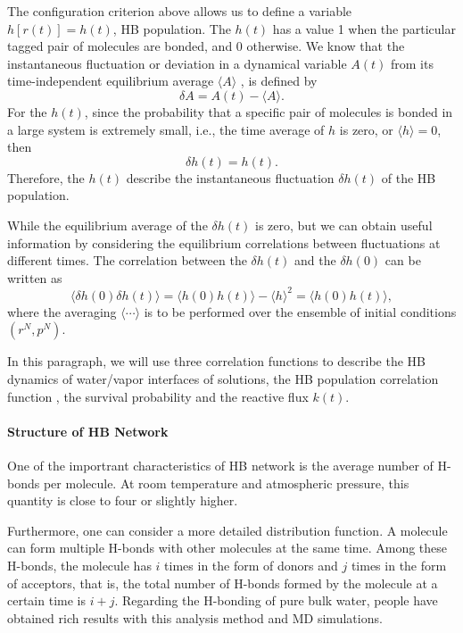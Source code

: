 The configuration criterion above allows us to define a variable $h[r(t)] = h(t)$, HB population. 
The $h(t)$ has a value 1 when the particular tagged pair of molecules are bonded, and 0 otherwise. 
We know that the instantaneous fluctuation or deviation in a dynamical variable $A(t)$ from its time-independent equilibrium average $\langle A\rangle$ , 
is defined by \cite{DC87} 
$$
\delta A = A(t) - \langle A\rangle.
$$
For the $h(t)$, since the probability that a specific pair of molecules is bonded in a large system is extremely small, i.e., 
the time average of $h$ is zero, or  
$\langle h \rangle = 0$,
then
$$
\delta h(t) = h(t).
$$
Therefore, the $h(t)$ describe the instantaneous fluctuation $\delta h(t)$  of the HB population.  

While the equilibrium average of the $\delta h(t)$ is zero, but we can obtain useful information by considering the equilibrium 
correlations between fluctuations at different times. The correlation between the $\delta h(t)$ and the $\delta h(0)$ can be written as 
$$
\langle \delta h(0) \delta h(t)\rangle = \langle h(0)h(t)\rangle-\langle h \rangle^2 = \langle h(0)h(t)\rangle,
$$
where the averaging $\langle\cdots\rangle$ is to be performed over the ensemble of initial conditions $(r^N, p^N)$.


In this paragraph, we will use three correlation functions to describe the HB dynamics of water/vapor interfaces of solutions,
the HB population correlation function \CHB, the survival probability \SHB and the reactive flux $k(t)$. \cite{Rapaport1983}

\paragraph{Structure of HB Network}
One of the importrant characteristics of HB network is the average number of H-bonds per molecule. 
At room temperature and atmospheric pressure, this quantity is close to four or slightly higher. \cite{Malenkov2006} 

Furthermore, one can consider a more detailed distribution function. A molecule can form multiple H-bonds with other molecules at the same time.
 Among these H-bonds, the molecule has $i$ times in the form of donors and $j$ times in the form of acceptors, 
that is, the total number of H-bonds formed by the molecule at a certain time is $i+j$.
Regarding the H-bonding of pure bulk water, people have obtained rich results with this analysis method and MD simulations. \cite{Malenkov1990,Malenkov2006}

